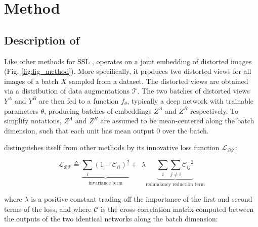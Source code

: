 \section{Method}


\subsection{Description of \AlgoName{}}






Like other methods for SSL \cite{caron2020swav,grill2020bootstrap,chen2020simple,he2019momentum,misra2019self}, \AlgoName{} operates on a joint embedding of distorted images (Fig. \ref{fig:fig_method}). More specifically, it produces two distorted views for all images of a batch $X$ sampled from a dataset. The distorted views are obtained via a distribution of data augmentations $\mathcal{T}$. The two batches of distorted views $Y^A$ and $Y^B$ are then fed to a function $f_{\theta}$, typically a deep network with trainable parameters $\theta$, producing batches of embeddings $Z^{A}$ and $Z^{B}$ respectively. To simplify notations, $Z^{A}$ and $Z^{B}$ are assumed to be mean-centered along the batch dimension, such that each unit has mean output 0 over the batch. 

\AlgoName{} distinguishes itself from other methods by its innovative loss function $\mathcal{L_{BT}}$:

\begin{equation}
\mathcal{L_{BT}} \triangleq  \underbrace{\sum_i  (1-\mathcal{C}_{ii})^2}_\text{invariance term}  + ~~\lambda \underbrace{\sum_{i}\sum_{j \neq i} {\mathcal{C}_{ij}}^2}_\text{redundancy reduction term}
\label{eq:lossBarlow}
\end{equation}

where $\lambda$ is a positive constant trading off the importance of the first and second terms of the loss, and where $\mathcal{C}$ is the cross-correlation matrix computed between the outputs of the two identical networks along the batch dimension:

